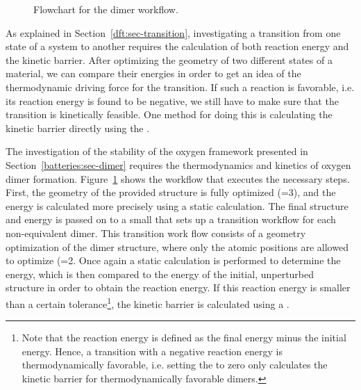 \begin{refsection}
 
\begin{figure}[ht!] 
\centering 
 
\caption{\label{automation:fig-dimer} Flowchart for the dimer workflow.} 
\end{figure} 

As explained in Section~\ref{dft:sec-transition}, investigating a transition 
from one state of a system to another requires the calculation of both 
reaction energy and the kinetic barrier. After optimizing the geometry of two 
different states of a material, we can compare their energies in order to get 
an idea of the thermodynamic driving force for the transition. If such a 
reaction is favorable, i.e. its reaction energy is found to be negative, we 
still have to make sure that the transition is kinetically feasible. One 
method for doing this is calculating the kinetic barrier directly using the 
. 
 
The investigation of the stability of the oxygen framework presented in 
Section~\ref{batteries:sec-dimer} requires the thermodynamics and kinetics of 
oxygen dimer formation. Figure~\ref{automation:fig-dimer} shows the workflow 
that executes the necessary steps. First, the geometry of the provided 
structure is fully optimized (=3), and the energy is calculated 
more precisely using a static calculation. The final structure and energy is 
passed on to a small  that sets up a transition workflow
for each non-equivalent dimer. This transition work flow consists of a 
geometry optimization of the dimer structure, where only the atomic positions 
are allowed to optimize (=2. Once again a static calculation is 
performed to determine the energy, which is then compared to the energy of the 
initial, unperturbed structure in order to obtain the reaction energy. If this 
reaction energy is smaller than a certain tolerance\footnote{Note that the reaction energy is defined as the final energy minus the initial energy. Hence, a transition with a negative reaction energy is thermodynamically favorable, i.e. setting the  to zero only calculates the kinetic barrier for thermodynamically favorable dimers.}, the kinetic barrier is 
calculated using a . 


\end{refsection}
